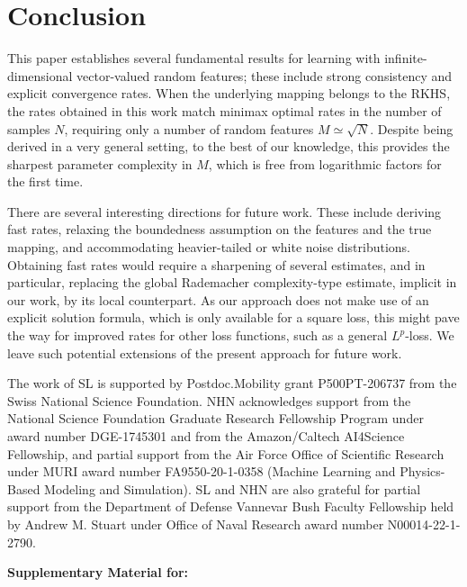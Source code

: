 \documentclass{article}
\makeatletter
\theoremstyle{plain}
\theoremstyle{my_def}
\theoremstyle{my_rem}
\numberwithin{equation}{section}
\numberwithin{theorem}{section}%
\let\inserttitle\@title
\makeatother
\begin{document}
\section{Conclusion}\label{sec:conclusion}
This paper establishes several fundamental results for learning with infinite-dimensional vector-valued random features; these include strong consistency and explicit convergence rates. When the underlying mapping belongs to the RKHS, the rates obtained in this work match minimax optimal rates in the number of samples $N$, requiring only a number of random features $M\simeq \sqrt{N}$. Despite being derived in a very general setting, to the best of our knowledge, this provides the sharpest parameter complexity in $M$, which is free from logarithmic factors for the first time. 

There are several interesting directions for future work. These include deriving fast rates, relaxing the boundedness assumption on the features and the true mapping, and accommodating heavier-tailed or white noise distributions. Obtaining fast rates would require a sharpening of several estimates, and in particular, replacing the global Rademacher complexity-type estimate, implicit in our work, by its local counterpart. As our approach does not make use of an explicit solution formula, which is only available for a square loss, this might pave the way for improved rates for other loss functions, such as a general $L^p$-loss. We leave such potential extensions of the present approach for future work.


\begin{ack}
The work of SL is supported by Postdoc.Mobility grant P500PT-206737 from the Swiss National Science Foundation. NHN acknowledges support from the National Science Foundation Graduate Research Fellowship Program under award number DGE-1745301 and from the Amazon/Caltech AI4Science Fellowship, and partial support from the Air Force Office
of Scientific Research under MURI award number FA9550-20-1-0358 (Machine Learning and
Physics-Based Modeling and Simulation). SL and NHN are also grateful for partial support from the Department of Defense Vannevar Bush Faculty Fellowship
held by Andrew M. Stuart under Office of Naval Research award number N00014-22-1-2790.
\end{ack}

{


}

\newpage
\begin{center}
{\bf Supplementary Material for:} \\ 
\inserttitle \\
\end{center}
\end{document}
